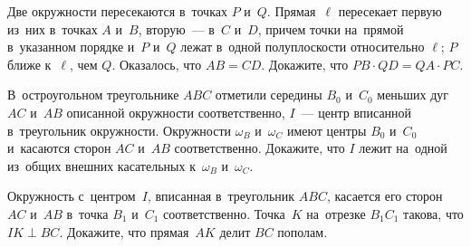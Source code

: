 \begin{problems}
\item
Две окружности пересекаются в~точках $P$ и~$Q$.
Прямая~$\ell$ пересекает первую из~них в~точках $A$ и~$B$, вторую~— в~$C$
и~$D$, причем точки на~прямой в~указанном порядке и~$P$ и~$Q$ лежат в~одной
полуплоскости относительно $\ell$;
$P$ ближе к~$\ell$, чем $Q$.
Оказалось, что $AB = CD$.
Докажите, что $PB \cdot QD = QA \cdot PC$.

\item
В~остроугольном треугольнике $ABC$ отметили середины $B_0$ и~$C_0$ меньших дуг
$AC$ и~$AB$ описанной окружности соответственно, $I$~— центр вписанной
в~треугольник окружности.
Окружности $\omega_B$ и~$\omega_C$ имеют центры $B_0$ и~$C_0$ и~касаются сторон
$AC$ и~$AB$ соответственно.
Докажите, что $I$ лежит на~одной из~общих внешних касательных к~$\omega_B$
и~$\omega_C$.

\item
Окружность с~центром~$I$, вписанная в~треугольник $ABC$, касается его сторон
$AC$ и~$AB$ в~точка $B_1$ и~$C_1$ соответственно.
Точка~$K$ на~отрезке $B_1C_1$ такова, что $IK \perp BC$.
Докажите, что прямая~$AK$ делит $BC$ пополам.


\end{problems}


